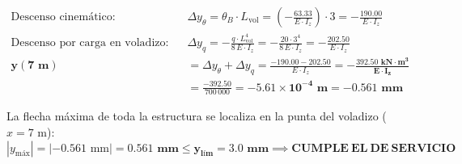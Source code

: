 {\begin{enumerate}
\begin{align}
                  \text{Descenso cinemático:} \quad           & \Delta y_{\theta} = \theta_B \cdot L_{\text{vol}} = \left(-\frac{63.33}{E \cdot I_z}\right) \cdot 3 = -\frac{190.00}{E \cdot I_z}                                                  \\
                  \text{Descenso por carga en voladizo:} \quad& \Delta y_{q} = -\frac{q \cdot L_{\text{vol}}^4}{8\,E \cdot I_z} = -\frac{20 \cdot 3^4}{8\,E \cdot I_z} = -\frac{202.50}{E \cdot I_z}                                                    \\
                  \mathbf{y(7\text{ m})}                      & = \Delta y_{\theta} + \Delta y_{q} = \frac{-190.00 - 202.50}{E \cdot I_z} = \mathbf{-\frac{392.50\text{ kN}\cdot\text{m}^3}{E \cdot I_z}} \nonumber                               \\
                                                              & = \frac{-392.50}{700\,000} = \mathbf{-5.61 \times 10^{-4}\text{ m} = -0.561\text{ mm}}
              \end{align}
    \end{enumerate}

    \begin{tcolorbox}[colback=green!5, colframe=green!60!black, title=\textbf{Verificación Final de Flechas en ELS}]
        La flecha máxima de toda la estructura se localiza en la punta del voladizo ($x = 7\text{ m}$):
        \begin{equation}
            |y_{\text{máx}}| = |-0.561\text{ mm}| = \mathbf{0.561\text{ mm} \le y_{\text{lím}} = 3.0\text{ mm}} \implies \mathbf{CUMPLE\ EL\ DE\ SERVICIO}
        \end{equation}
    \end{tcolorbox}
}

